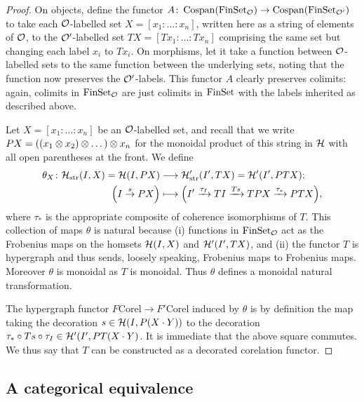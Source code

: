 \begin{proof}
  On objects, define the functor $A{\colon} \operatorname{{Cospan}}(\mathrm{FinSet}_{\mathcal O}) \to
  \operatorname{{Cospan}}(\mathrm{FinSet}_{\mathcal O'})$ to take each $\mathcal O$-labelled set $X=[x_1:\ldots:x_n]$,
  written here as a string of elements of $\mathcal O$, to the $\mathcal O'$-labelled set
  $TX=[Tx_1:\ldots:Tx_n]$ comprising the same set but changing each label $x_i$ to
  $Tx_i$. On morphisms, let it take a function between $\mathcal O$-labelled sets to
  the same function between the underlying sets, noting that the function now
  preserves the $\mathcal O'$-labels. This functor $A$ clearly preserves colimits:
  again, colimits in $\mathrm{FinSet}_{\mathcal O}$ are just colimits in $\mathrm{FinSet}$ with the
  labels inherited as described above.

  Let $X=[x_1:\ldots:x_n]$ be an $\mathcal O$-labelled set, and recall that we write
  $PX= ((x_1\otimes x_2) \otimes \dots )\otimes x_n$ for the monoidal product of this string
  in $\mathcal H$ with all open parentheses at the front. We define
  \begin{align*}
    \theta_X{\colon} \mathcal H_{\mathrm{str}}(I,X) = \mathcal H(I,PX) &\longrightarrow \mathcal
    H'_{\mathrm{str}}(I', TX)= \mathcal H'(I',PTX); \\
    \Big(I \stackrel{s}\to PX\Big) &\longmapsto \Big(I' \xrightarrow{\tau_I} TI
    \xrightarrow{Ts} TPX \xrightarrow{\tau_\ast} PTX\Big), 
  \end{align*}
  where $\tau_\ast$ is the appropriate composite of coherence isomorphisms of
  $T$. This collection of maps $\theta$ is natural because (i) functions in
  $\mathrm{FinSet}_{\mathcal O}$ act as the Frobenius maps on the homsets $\mathcal H(I,X)$ and
  $\mathcal H'(I',TX)$, and (ii) the functor $T$ is hypergraph and thus sends,
  loosely speaking, Frobenius maps to Frobenius maps. Moreover $\theta$ is
  monoidal as $T$ is monoidal.  Thus $\theta$ defines a monoidal natural
  transformation.

  The hypergraph functor $F\mathrm{Corel} \to F'\mathrm{Corel}$ induced by
  $\theta$ is by definition the map taking the decoration $s \in \mathcal
  H(I,P(X\cdot Y))$ to the decoration $\tau_\ast \circ Ts \circ
  \tau_I \in \mathcal H'(I',PT(X \cdot Y)$. It is immediate that the above square
  commutes. We thus say that $T$ can be constructed as a decorated corelation
  functor.
\end{proof}

\subsection{A categorical equivalence}


